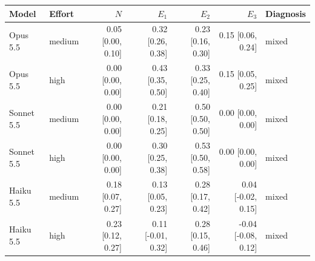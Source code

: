\begin{tabular}{@{}llrrrrl@{}}
\toprule
Model & Effort & $N$ & $E_1$ & $E_2$ & $E_3$ & Diagnosis \\
\midrule
Opus 5.5 & medium & 0.05 {\scriptsize[0.00, 0.10]} & 0.32 {\scriptsize[0.26, 0.38]} & 0.23 {\scriptsize[0.16, 0.30]} & 0.15 {\scriptsize[0.06, 0.24]} & mixed \\
Opus 5.5 & high & 0.00 {\scriptsize[0.00, 0.00]} & 0.43 {\scriptsize[0.35, 0.50]} & 0.33 {\scriptsize[0.25, 0.40]} & 0.15 {\scriptsize[0.05, 0.25]} & mixed \\
Sonnet 5.5 & medium & 0.00 {\scriptsize[0.00, 0.00]} & 0.21 {\scriptsize[0.18, 0.25]} & 0.50 {\scriptsize[0.50, 0.50]} & 0.00 {\scriptsize[0.00, 0.00]} & mixed \\
Sonnet 5.5 & high & 0.00 {\scriptsize[0.00, 0.00]} & 0.30 {\scriptsize[0.25, 0.38]} & 0.53 {\scriptsize[0.50, 0.58]} & 0.00 {\scriptsize[0.00, 0.00]} & mixed \\
Haiku 5.5 & medium & 0.18 {\scriptsize[0.07, 0.27]} & 0.13 {\scriptsize[0.05, 0.23]} & 0.28 {\scriptsize[0.17, 0.42]} & 0.04 {\scriptsize[-0.02, 0.15]} & mixed \\
Haiku 5.5 & high & 0.23 {\scriptsize[0.12, 0.27]} & 0.11 {\scriptsize[-0.01, 0.32]} & 0.28 {\scriptsize[0.15, 0.46]} & -0.04 {\scriptsize[-0.08, 0.12]} & mixed \\
\bottomrule
\end{tabular}
